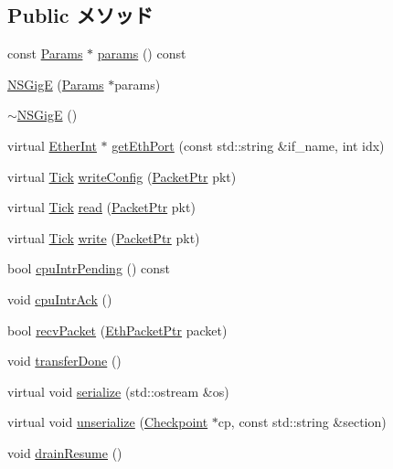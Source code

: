 \subsection*{Public メソッド}
\begin{DoxyCompactItemize}
\item 
const \hyperlink{classNSGigE_a3d96e676dc626c146631b6fa53a9d823}{Params} $\ast$ \hyperlink{classNSGigE_acd3c3feb78ae7a8f88fe0f110a718dff}{params} () const 
\item 
\hyperlink{classNSGigE_a13f27d8f13473f650bc05ab0f2c3bcfe}{NSGigE} (\hyperlink{classNSGigE_a3d96e676dc626c146631b6fa53a9d823}{Params} $\ast$params)
\item 
\hyperlink{classNSGigE_a57c257403a1ffa2375fb253ea11a82dc}{$\sim$NSGigE} ()
\item 
virtual \hyperlink{classEtherInt}{EtherInt} $\ast$ \hyperlink{classNSGigE_a10260c5a583c0894dcdcd1ced50a53ae}{getEthPort} (const std::string \&if\_\-name, int idx)
\item 
virtual \hyperlink{base_2types_8hh_a5c8ed81b7d238c9083e1037ba6d61643}{Tick} \hyperlink{classNSGigE_aac7b61a78530109bfa20923a53064bbf}{writeConfig} (\hyperlink{classPacket}{PacketPtr} pkt)
\item 
virtual \hyperlink{base_2types_8hh_a5c8ed81b7d238c9083e1037ba6d61643}{Tick} \hyperlink{classNSGigE_a613ec7d5e1ec64f8d21fec78ae8e568e}{read} (\hyperlink{classPacket}{PacketPtr} pkt)
\item 
virtual \hyperlink{base_2types_8hh_a5c8ed81b7d238c9083e1037ba6d61643}{Tick} \hyperlink{classNSGigE_a4cefab464e72b5dd42c003a0a4341802}{write} (\hyperlink{classPacket}{PacketPtr} pkt)
\item 
bool \hyperlink{classNSGigE_a8f53e358ba260670dbc7296b35482316}{cpuIntrPending} () const 
\item 
void \hyperlink{classNSGigE_aa1dc801f063bc87ddb1cf8c618ec692e}{cpuIntrAck} ()
\item 
bool \hyperlink{classNSGigE_ad54e71348f53dfb5444979e9bfaf3164}{recvPacket} (\hyperlink{classRefCountingPtr}{EthPacketPtr} packet)
\item 
void \hyperlink{classNSGigE_ac47b2c25cccfafe7e2c12673a1b3e793}{transferDone} ()
\item 
virtual void \hyperlink{classNSGigE_ad6272f80ae37e8331e3969b3f072a801}{serialize} (std::ostream \&os)
\item 
virtual void \hyperlink{classNSGigE_af22e5d6d660b97db37003ac61ac4ee49}{unserialize} (\hyperlink{classCheckpoint}{Checkpoint} $\ast$cp, const std::string \&section)
\item 
void \hyperlink{classNSGigE_a8f020d3237536fe007fc488c4125c5d8}{drainResume} ()
\end{DoxyCompactItemize}
